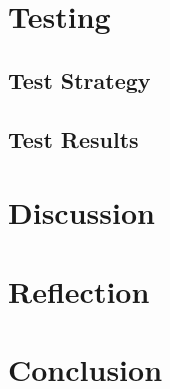 \documentclass[a4paper,11pt]{article}
\begin{document}
\pagebreak
\section{Testing}


\subsection{Test Strategy}


\subsection{Test Results}


\pagebreak
\section{Discussion}


\pagebreak
\section{Reflection}


\pagebreak
\section{Conclusion}


\pagebreak

\end{document}
